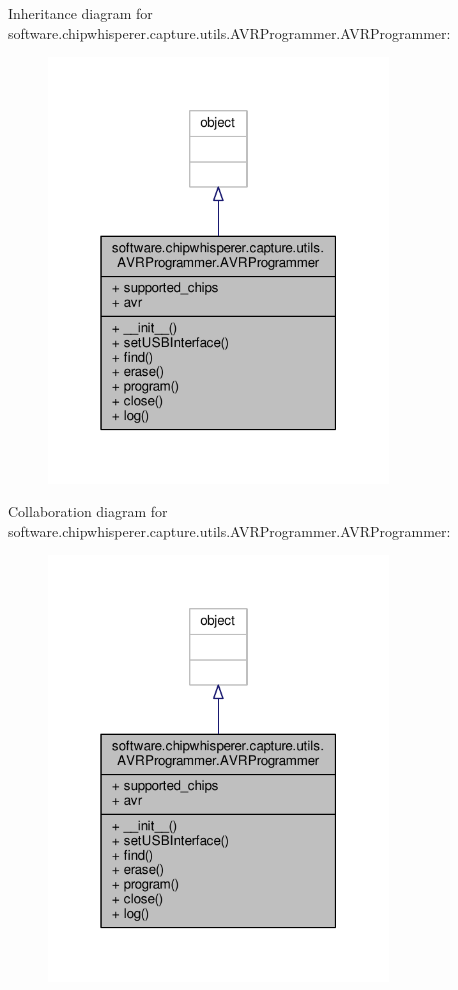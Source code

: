 Inheritance diagram for software.\+chipwhisperer.\+capture.\+utils.\+A\+V\+R\+Programmer.\+A\+V\+R\+Programmer\+:\nopagebreak
\begin{figure}[H]
\begin{center}
\leavevmode
\includegraphics[width=256pt]{d5/dfc/classsoftware_1_1chipwhisperer_1_1capture_1_1utils_1_1AVRProgrammer_1_1AVRProgrammer__inherit__graph}
\end{center}
\end{figure}


Collaboration diagram for software.\+chipwhisperer.\+capture.\+utils.\+A\+V\+R\+Programmer.\+A\+V\+R\+Programmer\+:\nopagebreak
\begin{figure}[H]
\begin{center}
\leavevmode
\includegraphics[width=256pt]{df/da0/classsoftware_1_1chipwhisperer_1_1capture_1_1utils_1_1AVRProgrammer_1_1AVRProgrammer__coll__graph}
\end{center}
\end{figure}


